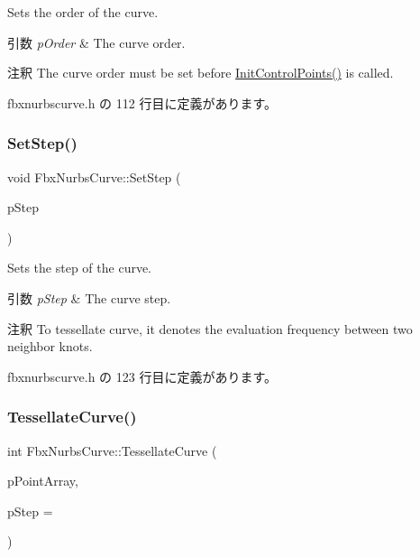 Sets the order of the curve. 
\begin{DoxyParams}{引数}
{\em p\+Order} & The curve order. \\
\hline
\end{DoxyParams}
\begin{DoxyRemark}{注釈}
The curve order must be set before \hyperlink{class_fbx_nurbs_curve_ac89cc4d5bf1bef1d88ee1b6e4b18be9b}{Init\+Control\+Points()} is called. 
\end{DoxyRemark}


 fbxnurbscurve.\+h の 112 行目に定義があります。

\mbox{\label{class_fbx_nurbs_curve_ab789815bcd27978f3a4cf57bb494c7f7}} 
\subsubsection{\texorpdfstring{Set\+Step()}{SetStep()}}
{\footnotesize\ttfamily void Fbx\+Nurbs\+Curve\+::\+Set\+Step (\begin{DoxyParamCaption}\item[{int}]{p\+Step }\end{DoxyParamCaption})\hspace{0.3cm}{\ttfamily [inline]}}

Sets the step of the curve. 
\begin{DoxyParams}{引数}
{\em p\+Step} & The curve step. \\
\hline
\end{DoxyParams}
\begin{DoxyRemark}{注釈}
To tessellate curve, it denotes the evaluation frequency between two neighbor knots. 
\end{DoxyRemark}


 fbxnurbscurve.\+h の 123 行目に定義があります。

\mbox{\label{class_fbx_nurbs_curve_a5e31ed3aff19c0fb28dd18492d044fe8}} 
\subsubsection{\texorpdfstring{Tessellate\+Curve()}{TessellateCurve()}\hspace{0.1cm}{\footnotesize\ttfamily [1/2]}}
{\footnotesize\ttfamily int Fbx\+Nurbs\+Curve\+::\+Tessellate\+Curve (\begin{DoxyParamCaption}\item[{\hyperlink{class_fbx_array}{Fbx\+Array}$<$ \hyperlink{class_fbx_vector4}{Fbx\+Vector4} $>$ \&}]{p\+Point\+Array,  }\item[{int}]{p\+Step = {} }\end{DoxyParamCaption})}


